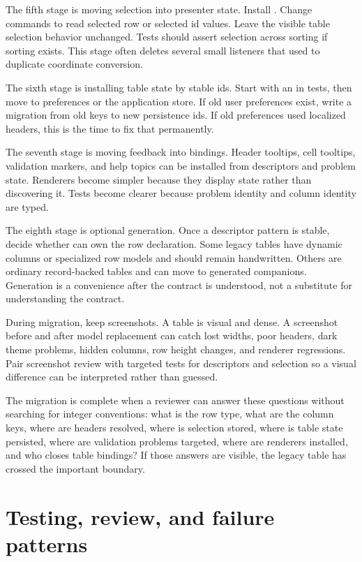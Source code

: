 The fifth stage is moving selection into presenter state. Install
. Change commands to read selected row or selected
id values. Leave the visible table selection behavior unchanged. Tests should
assert selection across sorting if sorting exists. This stage often deletes
several small listeners that used to duplicate coordinate conversion.

The sixth stage is installing table state by stable ids. Start with an
 in tests, then move to preferences or the
application store. If old user preferences exist, write a migration from old
keys to new persistence ids. If old preferences used localized headers, this
is the time to fix that permanently.

The seventh stage is moving feedback into bindings. Header tooltips, cell
tooltips, validation markers, and help topics can be installed from descriptors
and problem state. Renderers become simpler because they display state rather
than discovering it. Tests become clearer because problem identity and column
identity are typed.

The eighth stage is optional generation. Once a descriptor pattern is stable,
decide whether  can own the row declaration. Some legacy
tables have dynamic columns or specialized row models and should remain
handwritten. Others are ordinary record-backed tables and can move to
generated companions. Generation is a convenience after the contract is
understood, not a substitute for understanding the contract.

During migration, keep screenshots. A table is visual and dense. A screenshot
before and after model replacement can catch lost widths, poor headers, dark
theme problems, hidden columns, row height changes, and renderer regressions.
Pair screenshot review with targeted tests for descriptors and selection so a
visual difference can be interpreted rather than guessed.

The migration is complete when a reviewer can answer these questions without
searching for integer conventions: what is the row type, what are the column
keys, where are headers resolved, where is selection stored, where is table
state persisted, where are validation problems targeted, where are renderers
installed, and who closes table bindings? If those answers are visible, the
legacy table has crossed the important boundary.

\section{Testing, review, and failure patterns}

